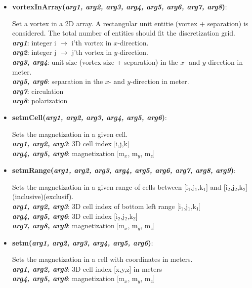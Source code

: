 \begin{itemize}
 \item {\vspace{-0.4cm}\textbf{vortexInArray(\textit{arg1, arg2, arg3, arg4, arg5, arg6, arg7, arg8})}:
				\flushright\parbox{0.9 \textwidth}{\vspace{-0.25cm} 
				Set a vortex in a 2D array. A rectangular unit entitie (vortex + separation) is considered.  The total number of entities should fit the discretization grid.\\
				\textbf{\textit{arg1}}: integer i $\rightarrow$ i'th vortex in $x$-direction.\\
				\textbf{\textit{arg2}}: integer j $\rightarrow$ j'th vortex in $y$-direction.\\
				\textbf{\textit{arg3, arg4}}: unit size (vortex size + separation) in the $x$- and $y$-direction in meter.\\
				\textbf{\textit{arg5, arg6}}: separation in the $x$- and $y$-direction in meter.\\
				\textbf{\textit{arg7}}: circulation\\
				\textbf{\textit{arg8}}: polarization
				}\flushleft}

 \item {\vspace{-0.4cm}\textbf{setmCell(\textit{arg1, arg2, arg3, arg4, arg5, arg6})}:
				\flushright\parbox{0.9 \textwidth}{\vspace{-0.25cm} 
				Sets the magnetization in a given cell.\\
				\textbf{\textit{arg1, arg2, arg3}}: 3D cell index [i,j,k]\\
				\textbf{\textit{arg4, arg5, arg6}}: magnetization [m$_x$, m$_y$, m$_z$]
				}\flushleft}

 \item {\vspace{-0.4cm}\textbf{setmRange(\textit{arg1, arg2, arg3, arg4, arg5, arg6, arg7, arg8, arg9})}:
				\flushright\parbox{0.9 \textwidth}{\vspace{-0.25cm} 
				Sets the magnetization in a given range of cells between [i$_1$,j$_1$,k$_1$] and [i$_2$,j$_2$,k$_2$] (inclusive)(exclusif).\\
				\textbf{\textit{arg1, arg2, arg3}}: 3D cell index of bottom left range [i$_1$,j$_1$,k$_1$]\\
				\textbf{\textit{arg4, arg5, arg6}}: 3D cell index [i$_2$,j$_2$,k$_2$]\\
				\textbf{\textit{arg7, arg8, arg9}}: magnetization [m$_x$, m$_y$, m$_z$]
				}\flushleft}

 \item {\vspace{-0.4cm}\textbf{setm(\textit{arg1, arg2, arg3, arg4, arg5, arg6})}:
				\flushright\parbox{0.9 \textwidth}{\vspace{-0.25cm} 
				Sets the magnetization in a cell with coordinates in meters.\\
				\textbf{\textit{arg1, arg2, arg3}}: 3D cell index [x,y,z] in meters\\
				\textbf{\textit{arg4, arg5, arg6}}: magnetization [m$_x$, m$_y$, m$_z$]
				}\flushleft}

\end{itemize}


